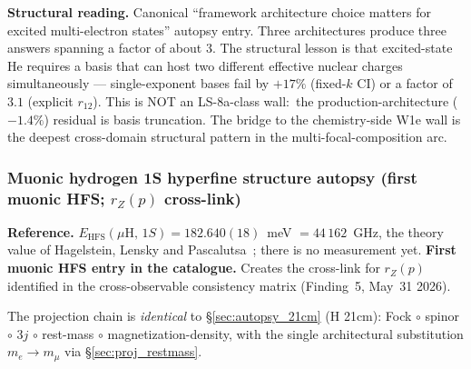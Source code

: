 \documentclass[11pt]{article}
\begin{document}
\textbf{Structural reading.}  Canonical ``framework architecture
choice matters for excited multi-electron states'' autopsy entry.
Three architectures produce three answers spanning a factor of about
$3$.  The structural lesson is that excited-state He requires a basis
that can host two different effective nuclear charges simultaneously
--- single-exponent bases fail by $+17\%$ (fixed-$k$ CI) or a factor
of $3.1$ (explicit $r_{12}$).  This is NOT an LS-8a-class wall:\ the
production-architecture ($-1.4\%$) residual is basis truncation.  The bridge to the chemistry-side W1e wall is the
deepest cross-domain structural pattern in the multi-focal-composition
arc.

\subsubsection{Muonic hydrogen 1S hyperfine structure autopsy
(first muonic HFS; $r_Z(p)$ cross-link)}
\label{sec:autopsy_muh_hfs}

\textbf{Reference.}  $E_\text{HFS}(\mu\text{H},\,1S) = 182.640(18)$~meV
$= 44\,162$~GHz, the theory value of Hagelstein, Lensky and
Pascalutsa~\cite{hagelstein_lensky_pascalutsa2023}; there is no
measurement yet.
\textbf{First muonic HFS entry in the catalogue.}  Creates the
cross-link for $r_Z(p)$ identified in the cross-observable consistency
matrix (Finding~5, May~31 2026).

The projection chain is \emph{identical} to
\S\ref{sec:autopsy_21cm} (H 21cm): Fock $\circ$ spinor $\circ$ 3$j$
$\circ$ rest-mass $\circ$ magnetization-density, with the single
architectural substitution $m_e \to m_\mu$ via
\S\ref{sec:proj_restmass}.
\end{document}
